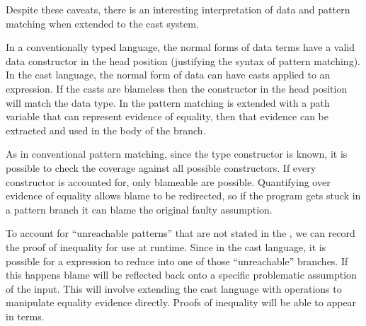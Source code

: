 Despite these caveats, there is an interesting interpretation of data and pattern matching when extended to the cast system.

In a conventionally typed language, the normal forms of data terms have a valid data constructor in the head position (justifying the syntax of pattern matching).
In the cast language, the normal form of data can have casts applied to an expression.
If the casts are blameless then the constructor in the head position will match the data type.
In the \clang{} pattern matching is extended with a path variable that can represent evidence of equality, then that evidence can be extracted and used in the body of the branch.

As in conventional pattern matching, since the type constructor is known, it is possible to check the coverage against all possible constructors.
If every constructor is accounted for, only blameable \scruts{} are possible.
Quantifying over evidence of equality allows blame to be redirected, so if the program gets stuck in a pattern branch it can blame the original faulty assumption.

To account for ``unreachable patterns'' that are not stated in the \slang, we can record the proof of inequality for use at runtime.
Since in the cast language, it is possible for a \case{} expression to reduce into one of those ``unreachable'' branches.
If this happens blame will be reflected back onto a specific problematic assumption of the input.
This will involve extending the cast language with operations to manipulate equality evidence directly.
Proofs of inequality will be able to appear in terms.
 









% 


